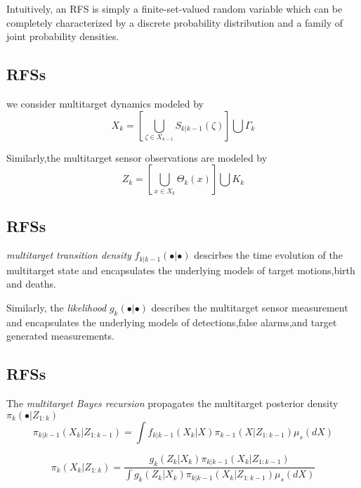 \documentclass[
paper=128mm:96mm, %
fontsize=11pt, %
pagesize, %
parskip=half-, %
]{scrartcl} %
\theoremstyle{mythmstyle} %
\begin{document}
 Intuitively, an RFS is simply a finite-set-valued random variable which can be completely
 characterized by a discrete probability distribution and a family of joint probability densities.



\clearpage
\subsection{RFSs}
we consider multitarget dynamics modeled by
\begin{equation}
   X_k = \left[\bigcup_{\zeta \in X_{k-1}}  S_{k|k-1}(\zeta)   \right] \bigcup { \Gamma_{k}}
\end{equation}

 Similarly,the multitarget sensor observations are modeled by
 \begin{equation}
   Z_k = \left[\bigcup_{x \in X_{k}}   \Theta_{k}(x)   \right] \bigcup { K_{k}}
\end{equation}
\clearpage
\subsection{RFSs}
\textit{multitarget transition density} $f_{k|k-1}(\bullet|\bullet)$ descirbes the time evolution of the
multitarget state and encapsulates the underlying models of target motions,birth and deaths.

Similarly, the \textit{likelihood} $g_k(\bullet|\bullet)$ describes the multitarget sensor measurement and encapsulates the underlying
models of detections,false alarms,and target generated measurements.





\clearpage
\subsection{RFSs}
The \textit{multitarget Bayes recursion} propagates the multitarget posterior density $\pi_k(\bullet|Z_{1:k})$
\begin{equation}
   \pi_{k|k-1}(X_{k} | Z_{1:k-1}) = \int f_{k|k-1}(X_k|X) \pi_{k-1}(X|Z_{1:k-1})\mu_s(dX)
\end{equation}

\begin{equation}
   \pi_{k}(X_{k} | Z_{1:k}) = \frac{g_k(Z_k|X_k)\pi_{k|k-1}(X_k|Z_{1:k-1})}{\int g_k(Z_k|X_k)\pi_{k|k-1}(X_k|Z_{1:k-1})\mu_s(dX)}
\end{equation}
\end{document}
